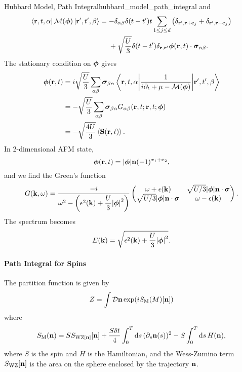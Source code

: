 \documentclass{article}
\begin{document}
\begin{example}{Hubbard Model, Path Integral}{hubbard_model_path_integral}
    and
    \begin{align*}
        \bra{\vb{r},t,\alpha} \mathcal{M}(\vb*{\phi})\ket{\vb{r}',t',\beta} &= -\delta_{\alpha\beta}\delta(t-t') t \sum_{1\le j\le d} \qty(\delta_{\vb{r}',\vb{r}+\vb{e}_j} + \delta_{\vb{r}',\vb{r}-\vb{e}_j}) \\
        &\phantom{{}={}} + \sqrt{\frac{U}{3}}\delta(t-t')\delta_{\vb{r},\vb{r}'}\vb*{\phi}(\vb{r},t)\cdot \vb*{\sigma}_{\alpha\beta}.
    \end{align*}
    The stationary condition on $\vb*{\phi}$ gives
    \begin{align*}
        \vb*{\phi}(\vb{r},t) &= i\sqrt{\frac{U}{3}} \sum_{\alpha\beta} \vb*{\sigma}_{\beta\alpha} \mel**{\vb{r},t,\alpha}{\frac{1}{i\partial_t + \mu - \mathcal{M}(\vb*{\phi})}}{\vb{r'},t',\beta} \\
        &= -\sqrt{\frac{U}{3}} \sum_{\alpha\beta} \vb*{\sigma}_{\beta\alpha} G_{\alpha\beta}(\vb{r},t;\vb{r},t;\vb*{\phi}) \\
        &= -\sqrt{\frac{4U}{3}}\ev{\vb{S}(\vb{r},t)}.
    \end{align*}
    In 2-dimensional AFM state,
    \[ \vb*{\phi}(\vb{r},t) = \abs{\vb*{\phi}}\vb{n} (-1)^{x_1+x_2}, \]
    and we find the Green's function
    \[ G(\vb{k},\omega) = \frac{-i}{\omega^2 - \qty(\epsilon^2(\vb{k})+\dfrac{U}{3}\abs{\vb*{\phi}}^2)} \begin{pmatrix}
        \omega + \epsilon(\vb{k}) & \sqrt{U/3}\abs{\vb*{\phi}}\vb{n}\cdot \vb*{\sigma} \\
        \sqrt{U/3}\abs{\vb*{\phi}}\vb{n}\cdot \vb*{\sigma} & \omega - \epsilon(\vb{k})
    \end{pmatrix}. \]
    The spectrum becomes
    \[ E(\vb{k}) = \sqrt{\epsilon^2(\vb{k}) + \frac{U}{3}\abs{\vb*{\phi}}^2}. \]
\end{example}

\paragraph*{Path Integral for Spins}
The partition function is given by
\[ Z = \int \mathcal{D} \vb{n} \exp(i S_{\mathrm{M}}(M)[\vb{n}]) \]
where
\[ S_{\mathrm{M}}(\vb{n}) = S S_{\mathrm{WZ}[\vb{n}]}[\vb{n}] + \frac{S \delta t}{4}\int_0^T \dd{s} (\partial_s \vb{n}(s))^2 - S \int_0^T \dd{s} H(\vb{n}), \]
where $S$ is the spin and $H$ is the Hamiltonian, and the Wess-Zumino term $S_{\mathrm{WZ}}[\vb{n}]$ is the area on the sphere enclosed by the trajectory $\vb{n}$.
\end{document}
